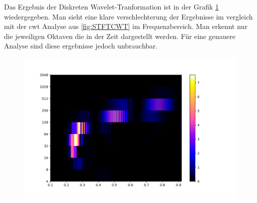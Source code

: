 Das Ergebnis der Diskreten Wavelet-Tranformation ist in der Grafik \ref{fig:sin-sweep} wiedergegeben. Man sieht eine klare verschlechterung der Ergebnisse im vergleich mit der cwt Analyse aus \ref{fig:STFTCWT} im Frequenzbereich. Man erkennt nur die jeweiligen Oktaven die in der Zeit dargestellt werden. Für eine genauere Analyse sind diese ergebnisse jedoch unbrauchbar.  

\begin{figure}[!ht]
	\centering
	\includegraphics[width=\linewidth]{papers/autotune/sections/frequenzanalyse/images/sweepdwt.jpg}
	\label{fig:sin-sweep}
\end{figure}%


\newpage

